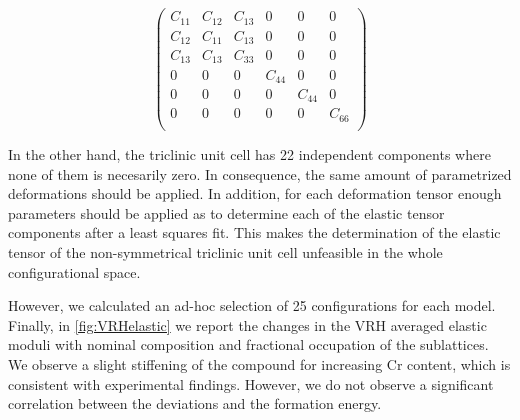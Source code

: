 \documentclass[superscriptaddress, 12pt]{revtex4-2}%
\begin{document}
\begin{equation}
  \begin{pmatrix}
    C_{11} & C_{12} & C_{13} & 0 & 0 & 0 \\
    C_{12} & C_{11} & C_{13} & 0 & 0 & 0 \\
    C_{13} & C_{13} & C_{33} & 0 & 0 & 0 \\
    0 & 0 & 0 & C_{44} & 0 & 0 \\
    0 & 0 & 0 & 0 & C_{44} & 0 \\
    0 & 0 & 0 & 0 & 0 & C_{66} \\
  \end{pmatrix}
\end{equation}

In the other hand, the triclinic unit cell has 22 independent components where none of them is necesarily zero. 
In consequence, the same amount of parametrized deformations should be applied.
In addition, for each deformation tensor enough parameters should be applied as to determine each of the elastic tensor components after a least squares fit.
This makes the determination of the elastic tensor of the non-symmetrical triclinic unit cell unfeasible in the whole configurational space.

 However, we calculated an ad-hoc selection of 25 configurations for each model. 
 Finally, in \autoref{fig:VRHelastic} we report the changes in the VRH averaged elastic moduli with nominal composition and fractional occupation of the sublattices. 
 We observe a slight stiffening of the compound for increasing Cr content, which is consistent with experimental findings.
 However, we do not observe a significant correlation between the deviations and the formation energy.
\end{document}
